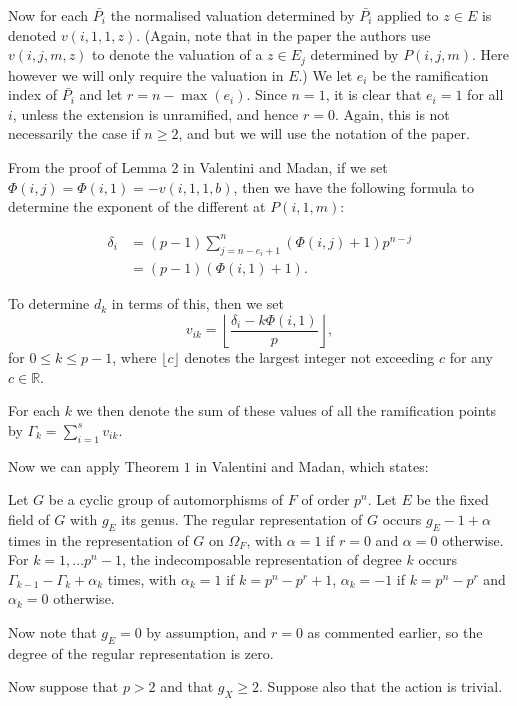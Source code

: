 Now for each $\bar{P_i}$ the normalised valuation determined by $\bar{P_i}$ applied to $z\in E$ is denoted $v(i,1,1,z)$.
(Again, note that in the paper the authors use $v(i,j,m,z)$ to denote the valuation of a $z\in E_j$ determined by $P(i,j,m).$
Here however we will only require the valuation in $E$.)
We let $e_i$ be the ramification index of $\bar{P_i}$ and let $r=n-\max(e_i)$.
Since $n=1$, it is clear that $e_i=1$ for all $i$, unless the extension is unramified, and hence $r=0$.
Again, this is not necessarily the case if $n\geq 2$, and but we will use the notation of the paper.

From the proof of Lemma 2 in Valentini and Madan, if we set $\Phi(i,j) = \Phi(i,1) = -v(i,1,1,b)$, then we have the following formula to determine the exponent of the different at $P(i,1,m)$:

\begin{align}\label{eq}
\delta_i & =  (p-1)\sum_{j=n-e_i+1}^n (\Phi(i,j) + 1)p^{n-j} \\
& =  (p-1)(\Phi(i,1) + 1).
\end{align}

To determine $d_k$ in terms of this, then we set 
    \[
    v_{ik} = \left\lfloor \frac{\delta_i - k\Phi(i,1)}{p} \right\rfloor,
    \]
for $0\leq k \leq p-1$, where $\lfloor c \rfloor$ denotes the largest integer not exceeding $c$ for any $c\in \mathbb{R}$.

For each $k$ we then denote the sum of these values of all the ramification points by $ \Gamma_k = \sum_{i=1}^s v_{ik}.$

Now we can apply Theorem $1$ in Valentini and Madan, which states:
    \begin{thm}
    Let $G$ be a cyclic group of automorphisms of $F$ of order $p^n$. 
    Let $E$ be the fixed field of $G$ with $g_E$ its genus.
    The regular representation of $G$ occurs $g_E-1+\alpha$ times in the representation of $G$ on $\Omega_F$, with $\alpha = 1$ if $r=0$ and $\alpha = 0$ otherwise.
    For $k=1,\ldots p^n-1$, the indecomposable representation of degree $k$ occurs $\Gamma_{k-1}-\Gamma_k + \alpha_k$ times, with $\alpha_k = 1$ if $k= p^n-p^r +1$, $\alpha_k = -1$ if $k=p^n-p^r$ and $\alpha_k = 0$ otherwise.
    \end{thm}

Now note that $g_E=0$ by assumption, and $r=0$ as commented earlier, so the degree of the regular representation is zero.

Now suppose that $p>2$ and that $g_X\geq 2$.
Suppose also that the action is trivial.


